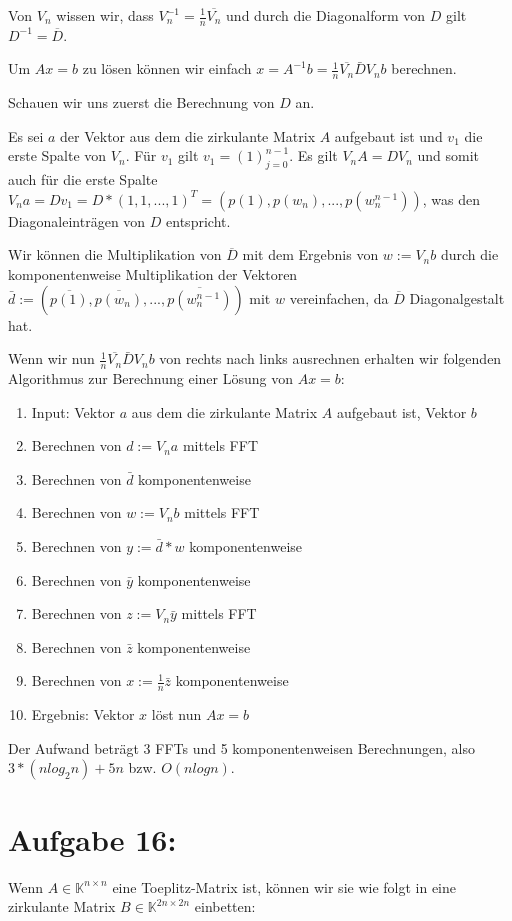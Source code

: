 \documentclass[]{article}
\begin{document}
Von $V_n$ wissen wir, dass $V_n^{-1} = \frac{1}{n} \overline{V_n}$ und durch die Diagonalform von $D$ gilt $D^{-1}=\overline{D}$.

Um $Ax=b$ zu lösen können wir einfach $x = A^{-1}b = \frac{1}{n} \overline{V_n} \bar{D}V_nb$ berechnen.

Schauen wir uns zuerst die Berechnung von $D$ an.

Es sei $a$ der Vektor aus dem die zirkulante Matrix $A$ aufgebaut ist und $v_1$ die erste Spalte von $V_n$. Für $v_1$ gilt $v_1 = (1)_{j=0}^{n-1}$. Es gilt $V_nA = DV_n$ und somit auch für die erste Spalte $V_na = Dv_1 = D*(1, 1, ..., 1)^T = (p(1), p(w_n), ..., p(w_n^{n-1}))$, was den Diagonaleinträgen von $D$ entspricht.

Wir können die Multiplikation von $\overline{D}$ mit dem Ergebnis von $w:=V_nb$ durch die komponentenweise Multiplikation der Vektoren $\bar{d}:=(\overline{p(1)}, \overline{p(w_n)}, ..., \overline{p(w_n^{n-1})})$ mit $w$ vereinfachen, da $\overline{D}$ Diagonalgestalt hat. 

Wenn wir nun $\frac{1}{n} \overline{V_n} \bar{D}V_nb$ von rechts nach links ausrechnen erhalten wir folgenden Algorithmus zur Berechnung einer Lösung von $Ax=b$: 

\begin{enumerate}
	\item[] Input: Vektor $a$ aus dem die zirkulante Matrix $A$ aufgebaut ist, Vektor $b$
	\item Berechnen von $d:=V_na$ mittels FFT
	\item Berechnen von $\bar{d}$ komponentenweise
	\item Berechnen von $w:=V_nb$ mittels FFT
	\item Berechnen von $y:=\bar{d}*w$ komponentenweise
	\item Berechnen von $\bar{y}$ komponentenweise
	\item Berechnen von $z:=V_n\bar{y}$ mittels FFT
	\item Berechnen von $\bar{z}$ komponentenweise
	\item Berechnen von $x:=\frac{1}{n}\bar{z}$ komponentenweise
	\item[] Ergebnis: Vektor $x$ löst nun $Ax=b$
\end{enumerate}

Der Aufwand beträgt 3 FFTs und 5 komponentenweisen Berechnungen, also $3*(n log_2 n) + 5n$ bzw. $O(n log n)$.

\section{Aufgabe 16:}
Wenn $A \in \mathbb{K}^{n\times n}$ eine Toeplitz-Matrix ist, können wir sie wie folgt in eine zirkulante Matrix $B \in \mathbb{K}^{2n\times 2n}$ einbetten:
\end{document}
